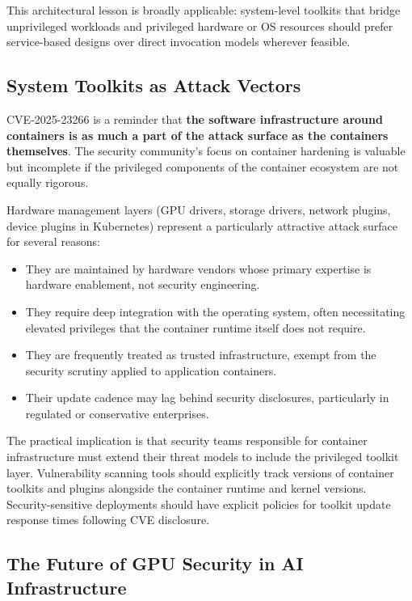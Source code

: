 This architectural lesson is broadly applicable: system-level toolkits that bridge unprivileged workloads and privileged hardware or OS resources should prefer service-based designs over direct invocation models wherever feasible.

\subsection{System Toolkits as Attack Vectors}
\label{subsec:toolkits-as-vectors}

CVE-2025-23266 is a reminder that \textbf{the software infrastructure around containers is as much a part of the attack surface as the containers themselves}. The security community's focus on container hardening is valuable but incomplete if the privileged components of the container ecosystem are not equally rigorous.
 
Hardware management layers (GPU drivers, storage drivers, network plugins, device plugins in Kubernetes) represent a particularly attractive attack surface for several reasons:
 
\begin{itemize}
  \item They are maintained by hardware vendors whose primary expertise is hardware enablement, not security engineering.
  \item They require deep integration with the operating system, often necessitating elevated privileges that the container runtime itself does not require.
  \item They are frequently treated as trusted infrastructure, exempt from the security scrutiny applied to application containers.
  \item Their update cadence may lag behind security disclosures, particularly in regulated or conservative enterprises.
\end{itemize}
 
The practical implication is that security teams responsible for container infrastructure must extend their threat models to include the privileged toolkit layer. Vulnerability scanning tools should explicitly track versions of container toolkits and plugins alongside the container runtime and kernel versions. Security-sensitive deployments should have explicit policies for toolkit update response times following CVE disclosure.

\subsection{The Future of GPU Security in AI Infrastructure}
\label{subsec:gpu-security-future}


